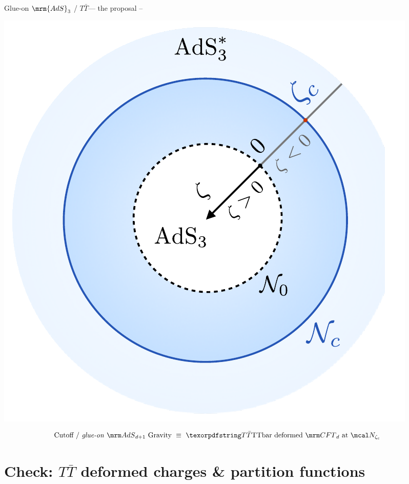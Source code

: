 \documentclass[aspectratio=169,10pt
	,noamsthm
]{beamer}
\newcommand{\TTbar}{\texorpdfstring{\ensuremath{T\bar{T}}}{TTbar}\xspace}
\begin{document}
\begin{frame}{Glue-on $\mrm{AdS}_3$ / \TTbar --- the proposal}{%
	\textcite{Apolo:2023vnm} -- 
}
\centering
\vspace{-.5\baselineskip}
\begin{minipage}{.5\textwidth}
\centering
\includegraphics[width=.8\linewidth]{img/diagram.pdf}
\end{minipage}
\vspace{-.8\baselineskip}
\begin{equation}
\stateGlueon
\end{equation}
\end{frame}

\section{\textbf{Check:} \TTbar deformed charges \& partition functions} \label{se:charges}
\end{document}
